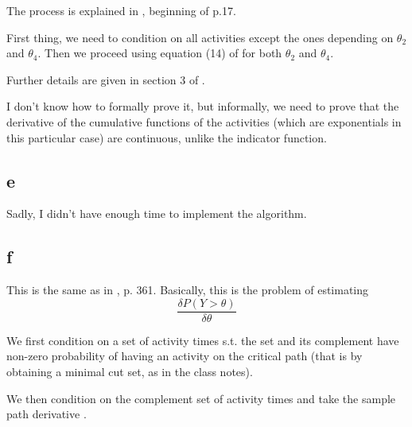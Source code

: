 \documentclass[12pt]{report}
\begin{document}
The process is explained in \citep{fu_gradient_2006}, beginning of p.17.

First thing, we need to condition on all activities except the ones depending on $\theta_2$ and $\theta_4$. Then we proceed using equation (14) of \citep{fu_sensitivity_2006} for both $\theta_2$ and $\theta_4$.

Further details are given in section 3 of \citep{fu_sensitivity_2006}.

I don't know how to formally prove it, but informally, we need to prove that the derivative of the cumulative functions of the activities (which are exponentials in this particular case) are continuous, unlike the indicator function.

\subsection*{e}

Sadly, I didn't have enough time to implement the algorithm.


\subsection*{f}



This is the same as in \citep{fu_sensitivity_2006}, p. 361. Basically, this is the problem of estimating 
$$\dfrac{\delta P(Y > \theta)}{\delta \theta}$$

We first condition on a set of activity times s.t. the set and its complement have non-zero probability of having an activity on the critical path (that is by obtaining a minimal cut set, as in the class notes).

We then condition on the complement set of activity times and take the sample path derivative \citep{fu_sensitivity_2006}.
\end{document}
